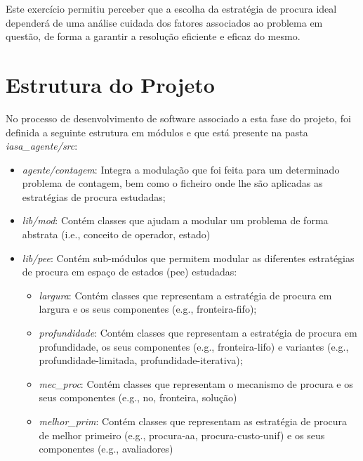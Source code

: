 Este exercício permitiu perceber que a escolha da estratégia de procura ideal dependerá de uma análise cuidada dos fatores associados ao problema em questão, de forma a garantir a resolução eficiente e eficaz do mesmo.


\section{Estrutura do Projeto}\label{sec:estrutura-do-projeto-3}

No processo de desenvolvimento de software associado a esta fase do projeto, foi definida a seguinte estrutura em módulos e que está presente na pasta \textit{iasa\_agente/src}:

\begin{itemize}
    \item \textit{agente/contagem}: Integra a modulação que foi feita para um determinado problema de contagem, bem como o ficheiro onde lhe são aplicadas as estratégias de procura estudadas;
    \item \textit{lib/mod}: Contém classes que ajudam a modular um problema de forma abstrata (i.e., conceito de operador, estado)
    \item \textit{lib/pee}: Contém sub-módulos que permitem modular as diferentes estratégias de procura em espaço de estados (pee) estudadas:
    \begin{itemize}
        \item \textit{largura}: Contém classes que representam a estratégia de procura em largura e os seus componentes (e.g., fronteira-fifo);
        \item \textit{profundidade}: Contém classes que representam a estratégia de procura em profundidade, os seus componentes (e.g., fronteira-lifo) e variantes (e.g., profundidade-limitada, profundidade-iterativa);
        \item \textit{mec\_proc}: Contém classes que representam o mecanismo de procura e os seus componentes (e.g., no, fronteira, solução)
        \item \textit{melhor\_prim}: Contém classes que representam as estratégia de procura de melhor primeiro (e.g., procura-aa, procura-custo-unif) e os seus componentes (e.g., avaliadores)
    \end{itemize}
\end{itemize}
